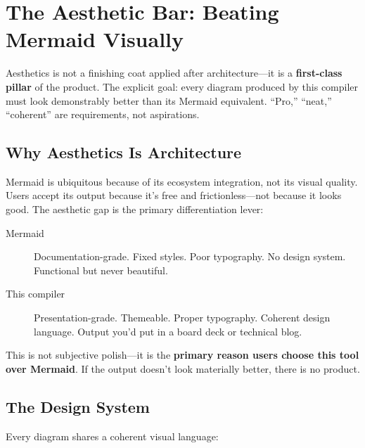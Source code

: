 \section{The Aesthetic Bar: Beating Mermaid Visually}
\label{sec:aesthetics}

Aesthetics is not a finishing coat applied after architecture---it is a \textbf{first-class
pillar} of the product. The explicit goal: every diagram produced by this compiler must look
demonstrably better than its Mermaid equivalent. ``Pro,'' ``neat,'' ``coherent'' are
requirements, not aspirations.

\subsection{Why Aesthetics Is Architecture}

Mermaid is ubiquitous because of its ecosystem integration, not its visual quality.
Users accept its output because it's free and frictionless---not because it looks good.
The aesthetic gap is the primary differentiation lever:

\begin{description}
  \item[Mermaid] Documentation-grade. Fixed styles. Poor typography. No design system.
        Functional but never beautiful.
  \item[This compiler] Presentation-grade. Themeable. Proper typography. Coherent design
        language. Output you'd put in a board deck or technical blog.
\end{description}

This is not subjective polish---it is the \textbf{primary reason users choose this tool
over Mermaid}. If the output doesn't look materially better, there is no product.

\subsection{The Design System}

Every diagram shares a coherent visual language:

